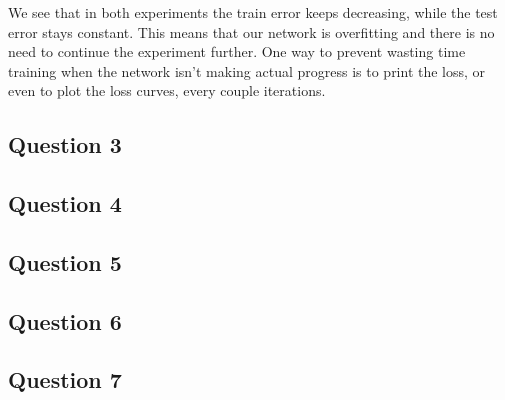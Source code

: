 \documentclass[12pt]{article}
\begin{document}
We see that in both experiments the train error keeps decreasing, while the test error stays constant.
This means that our network is overfitting and there is no need to continue the experiment further.
One way to prevent wasting time training when the network isn't making actual progress is to print the loss, or even to plot the loss curves, every couple iterations.

\subsection{Question 3}


\subsection{Question 4}

\subsection{Question 5}

\subsection{Question 6}

\subsection{Question 7}
\end{document}
